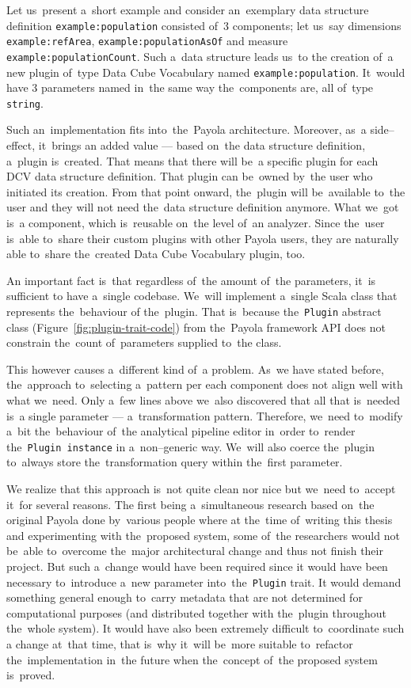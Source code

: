 \begin{sloppypar}
Let us~present a~short example and consider an~exemplary data structure definition \texttt{example:population}
consisted of~3 
components; let us~say dimensions \texttt{example:refArea}, \texttt{example:populationAsOf}
and measure \texttt{example:populationCount}. Such a~data structure leads us~to 
the creation of~a new plugin of~type Data Cube Vocabulary named 
\texttt{example:population}. It~would have 3 parameters named in~the same way the~components are, all of~type \texttt{string}.
\end{sloppypar}

Such an~implementation fits into~the~Payola architecture. Moreover, as~a side--effect, it~brings
an added value --- based on~the data structure definition, a~plugin is~created. 
That means that there will be~a specific plugin for each DCV data structure 
definition. That plugin can be~owned by~the user who initiated its creation. 
From that point onward, the~plugin will be~available to~the user and they
will not need the~data structure definition anymore. What we~got is~a 
component, which is~reusable on~the level of~an analyzer. Since the~user is~able to~share their custom plugins with other Payola users, they are
naturally able to~share the~created Data Cube Vocabulary plugin, too. 

An important fact is~that regardless of~the amount of~the parameters, it~is sufficient 
to have a~single codebase. We~will implement a~single Scala class that represents the~behaviour 
of the~plugin. That is~because the~\texttt{Plugin} abstract class (Figure~\ref{fig:plugin-trait-code})
from the~Payola framework
API does not constrain the~count of~parameters supplied to~the class.

This however causes a~different kind of~a problem. As~we have stated before, the~approach to~selecting a~pattern per each component does not align well with what we~need. Only a~few lines above we~also discovered that all that is~needed is~a 
single parameter --- a~transformation pattern. Therefore, we~need to~modify a~bit the~behaviour of~the analytical pipeline editor in~order to~render the~\texttt{Plugin instance}
in a~non--generic way. We~will also coerce the~plugin to~always store the~transformation query 
within the~first parameter.

We realize that this approach is~not quite clean nor nice but we~need to~accept it~for several reasons.
The first being a~simultaneous research based on~the original Payola done by~various people where
at the~time of~writing this thesis and experimenting with the~proposed system, some of~the researchers 
would not be~able to~overcome the~major architectural change and thus not finish their project.
But such a~change would have been required since 
it would have been necessary to~introduce a~new parameter into~the~\texttt{Plugin} trait. 
It would demand something general enough to~carry metadata that are not determined for 
computational purposes (and distributed together with the~plugin throughout the~whole system).
It would have also been extremely difficult to~coordinate such 
a change at~that time, that is~why it~will be~more suitable to~refactor the~implementation in~the future when the~concept of~the proposed system is~proved.

